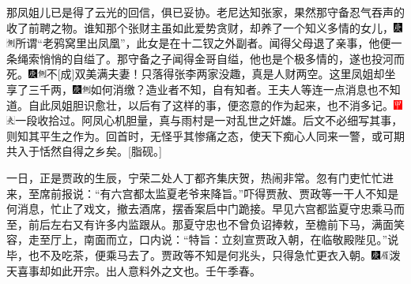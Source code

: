 那凤姐儿已是得了云光的回信，俱已妥协。老尼达知张家，果然那守备忍气吞声的收了前聘之物。谁知那个张财主虽如此爱势贪财，却养了一个知义多情的女儿，{\includegraphics[width=3mm]{../Images/00004}\includegraphics[width=3mm]{../Images/00011}\footnotesize \kaishu 所谓``老鸦窝里出凤凰''，此女是在十二钗之外副者。}闻得父母退了亲事，他便一条绳索悄悄的自缢了。那守备之子闻得金哥自缢，他也是个极多情的，遂也投河而死。{\includegraphics[width=3mm]{../Images/00004}\includegraphics[width=3mm]{../Images/00011}\footnotesize \kaishu 不{[}成{]}双美满夫妻！}只落得张李两家没趣，真是人财两空。这里凤姐却坐享了三千两，{\includegraphics[width=3mm]{../Images/00004}\includegraphics[width=3mm]{../Images/00011}\footnotesize \kaishu 如何消缴？造业者不知，自有知者。}王夫人等连一点消息也不知道。自此凤姐胆识愈壮，以后有了这样的事，便恣意的作为起来，也不消多记。{{\includegraphics[width=3mm]{../Images/00002}\includegraphics[width=3mm]{../Images/00012}\footnotesize \kaishu 一段收拾过。阿凤心机胆量，真与雨村是一对乱世之奸雄。后文不必细写其事，则知其平生之作为。回首时，无怪乎其惨痛之态，使天下痴心人同来一警，或可期共入于恬然自得之乡矣。}{[}脂砚。{]}}

一日，正是贾政的生辰，宁荣二处人丁都齐集庆贺，热闹非常。忽有门吏忙忙进来，至席前报说：``有六宫都太监夏老爷来降旨。''吓得贾赦、贾政等一干人不知是何消息，忙止了戏文，撤去酒席，摆香案启中门跪接。早见六宫都监夏守忠乘马而至，前后左右又有许多内监跟从。那夏守忠也不曾负诏捧敕，至檐前下马，满面笑容，走至厅上，南面而立，口内说：``特旨：立刻宣贾政入朝，在临敬殿陛见。''说毕，也不及吃茶，便乘马去了。贾政等不知是何兆头，只得急忙更衣入朝。{\includegraphics[width=3mm]{../Images/00004}\includegraphics[width=3mm]{../Images/00010}\footnotesize \kaishu 泼天喜事却如此开宗。出人意料外之文也。壬午季春。}

